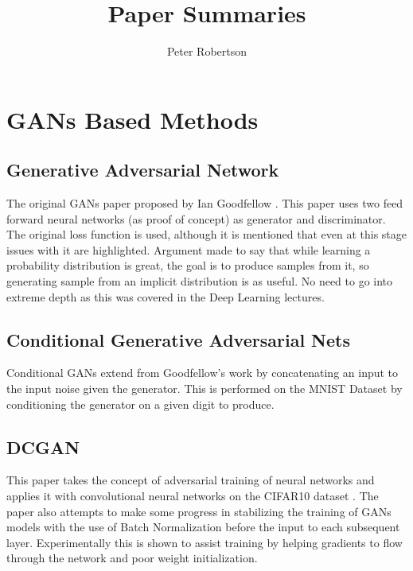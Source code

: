 \documentclass[12pt]{article}
\title{Paper Summaries}
\author{Peter Robertson}
\date{}
\begin{document}
\maketitle

\section{GANs Based Methods}
\subsection{Generative Adversarial Network}
The original GANs paper proposed by Ian Goodfellow \cite{Goodfellow2014}.
This paper uses two feed forward neural networks (as proof of concept) as generator and discriminator.
The original loss function is used, although it is mentioned that even at this stage issues with it are highlighted.
Argument made to say that while learning a probability distribution is great, the goal is to produce samples from it, so generating sample from an implicit distribution is as useful.
No need to go into extreme depth as this was covered in the Deep Learning lectures.

\subsection{Conditional Generative Adversarial Nets}
Conditional GANs \cite{Mirza2014} extend from Goodfellow's work \cite{Goodfellow2014} by concatenating an input to the input noise given the generator.
This is performed on the MNIST Dataset \cite{LeCun2010} by conditioning the generator on a given digit to produce.

\subsection{DCGAN}
This paper \cite{Radford2016} takes the concept of adversarial training of neural networks and applies it with convolutional neural networks on the CIFAR10 dataset \cite{Krizhevsky2009}.
The paper also attempts to make some progress in stabilizing the training of GANs models with the use of Batch Normalization before the input to each subsequent layer.
Experimentally this is shown to assist training by helping gradients to flow through the network and poor weight initialization.
\end{document}

